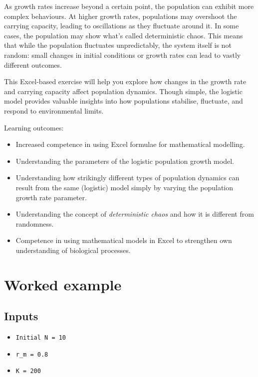 \documentclass[
  a4paper]{book}
\providecommand{\tightlist}{%
  \setlength{\itemsep}{0pt}\setlength{\parskip}{0pt}}
\begin{document}
As growth rates increase beyond a certain point, the population can exhibit more complex behaviours. At higher growth rates, populations may overshoot the carrying capacity, leading to oscillations as they fluctuate around it. In some cases, the population may show what's called deterministic chaos. This means that while the population fluctuates unpredictably, the system itself is not random: small changes in initial conditions or growth rates can lead to vastly different outcomes.

This Excel-based exercise will help you explore how changes in the growth rate and carrying capacity affect population dynamics. Though simple, the logistic model provides valuable insights into how populations stabilise, fluctuate, and respond to environmental limits.

Learning outcomes:

\begin{itemize}
\tightlist
\item
  Increased competence in using Excel formulae for mathematical modelling.
\item
  Understanding the parameters of the logistic population growth model.
\item
  Understanding how strikingly different types of population dynamics can result from the same (logistic) model simply by varying the population growth rate parameter.
\item
  Understanding the concept of \emph{deterministic chaos} and how it is different from randomness.
\item
  Competence in using mathematical models in Excel to strengthen own understanding of biological processes.
\end{itemize}

\section{Worked example}\label{worked-example-4}

\subsection{Inputs}\label{inputs-4}

\begin{itemize}
\tightlist
\item
  \texttt{Initial\ N\ =\ 10}
\item
  \texttt{r\_m\ =\ 0.8}
\item
  \texttt{K\ =\ 200}
\end{itemize}
\end{document}

